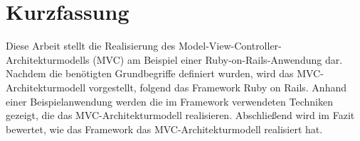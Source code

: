 \section*{Kurzfassung}
Diese Arbeit stellt die Realisierung des Model-View-Controller-Architekturmodells (MVC) am Beispiel einer Ruby-on-Rails-Anwendung dar. Nachdem die benötigten Grundbegriffe definiert wurden, wird das MVC-Architekturmodell vorgestellt, folgend das Framework Ruby on Rails. Anhand einer Beispielanwendung werden die im Framework verwendeten Techniken gezeigt, die das MVC-Architekturmodell realisieren. Abschließend wird im Fazit bewertet, wie das Framework das MVC-Architekturmodell realisiert hat.